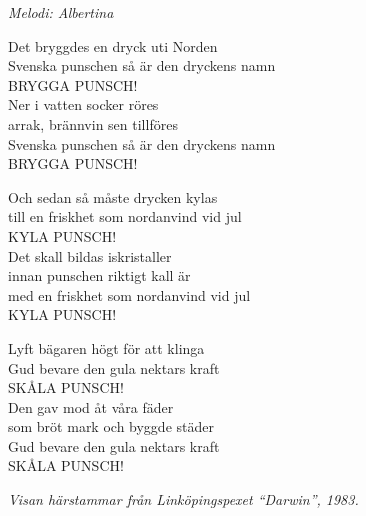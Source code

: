 {\footnotesize\textit{Melodi: Albertina}}\par
\vspace{10pt}
Det bryggdes en dryck uti Norden\\
Svenska punschen så är den dryckens namn\\
BRYGGA PUNSCH!\\
Ner i vatten socker röres\\
arrak, brännvin sen tillföres\\
Svenska punschen så är den dryckens namn\\
BRYGGA PUNSCH!\par
\vspace{10pt}
Och sedan så måste drycken kylas\\
till en friskhet som nordanvind vid jul\\
KYLA PUNSCH!\\
Det skall bildas iskristaller\\
innan punschen riktigt kall är\\
med en friskhet som nordanvind vid jul\\
KYLA PUNSCH!\par
\vspace{10pt}
Lyft bägaren högt för att klinga\\
Gud bevare den gula nektars kraft\\
SKÅLA PUNSCH!\\
Den gav mod åt våra fäder\\
som bröt mark och byggde städer\\
Gud bevare den gula nektars kraft\\
SKÅLA PUNSCH!\par
\vspace{10pt}
{\footnotesize\textit{Visan härstammar från Linköpingspexet ``Darwin'', 1983.}}
